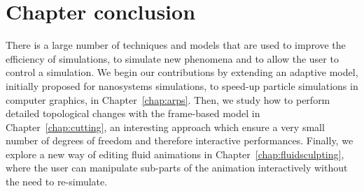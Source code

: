 \section{Chapter conclusion}
There is a large number of techniques and models that are used to improve the efficiency of simulations, to simulate new phenomena and to allow the user to control a simulation.
We begin our contributions by extending an adaptive model, initially proposed for nanosystems simulations, to speed-up particle simulations in computer graphics, in Chapter~\ref{chap:arps}.
Then, we study how to perform detailed topological changes with the frame-based model in Chapter~\ref{chap:cutting}, an interesting approach which ensure a very small number of degrees of freedom and therefore interactive performances.
Finally, we explore a new way of editing fluid animations in Chapter~\ref{chap:fluidsculpting}, where the user can manipulate sub-parts of the animation interactively without the need to re-simulate.
